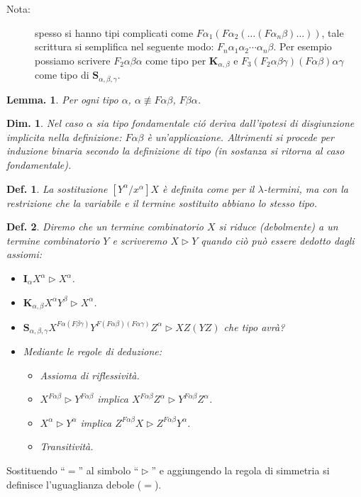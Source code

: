 \documentclass{book}
\newtheorem{definizione}{Def.}[chapter]
\newtheorem{lemma}{Lemma.}[chapter]
\newtheorem{dimostrazione}{Dim.}[chapter]
\newcommand*{\ii}{\mathbf{I}}    %
\newcommand*{\kk}{\mathbf{K}}    %
\newcommand*{\sss}{\mathbf{S}}   %
\newcommand*{\lbts}{$\lambda$-ter\-mi\-ni}
\begin{document}
\begin{description}
\item[Nota:]spesso si hanno tipi complicati come
$F\alpha_1(F\alpha_2(\ldots(F\alpha_n \beta)\ldots))$, tale scrittura si
semplifica nel seguente modo: $F_n \alpha_1 \alpha_2 \cdots \alpha_n \beta$.
Per esempio possiamo scrivere $F_2 \alpha\beta\alpha$ come tipo per
$\kk_{\alpha,\beta}$ e $F_3 (F_2 \alpha\beta\gamma)(F\alpha\beta)\alpha\gamma$
come tipo di $\sss_{\alpha,\beta,\gamma}$.
\end{description}

\begin{lemma}
Per ogni tipo $\alpha$, $\alpha \not\equiv F\alpha\beta$, $F\beta\alpha$.
\end{lemma}
\begin{dimostrazione}
Nel caso $\alpha$ sia tipo fondamentale ci\'o deriva dall'ipotesi di 
disgiunzione implicita nella definizione: $F\alpha\beta$ \`e un'applicazione.
Altrimenti si procede per induzione binaria secondo la definizione di tipo
(in sostanza si ritorna al caso fondamentale).
\end{dimostrazione}

\begin{definizione}
La sostituzione $[Y^\alpha / x^\alpha]X$ \`e definita come per il \lbts, ma
con la restrizione che la variabile e il termine sostituito abbiano lo stesso
tipo.
\end{definizione}

\begin{definizione}
Diremo che un termine combinatorio $X$ si riduce (debolmente) a un termine
combinatorio $Y$ e scriveremo $X \vartriangleright Y$ quando ci\`o pu\`o essere
dedotto dagli assiomi:
\begin{itemize}
\item[($I_\alpha$)]$\ii_\alpha X^\alpha \vartriangleright X^\alpha$.
\item[($K_{\alpha,\beta}$)]$\kk_{\alpha,\beta}X^\alpha Y^\beta 
\vartriangleright X^\alpha$.
\item[($S_{\alpha,\beta,\gamma}$)]$\sss_{\alpha,\beta,\gamma} 
X^{F\alpha(F\beta\gamma)}Y^{F(F\alpha\beta)(F\alpha\gamma)}Z^\alpha
\vartriangleright XZ(YZ)$ che tipo avr\`a?
\item[]Mediante le regole di deduzione:
  \begin{itemize}
    \item[-]Assioma di riflessivit\`a.
    \item[-]$X^{F\alpha\beta} \vartriangleright Y^{F\alpha\beta}$ implica
            $X^{F\alpha\beta}Z^\alpha \vartriangleright 
            Y^{F\alpha\beta}Z^\alpha$.
    \item[-]$X^\alpha \vartriangleright Y^\alpha$ implica $Z^{F\alpha\beta}X
            \vartriangleright Z^{F\alpha\beta}Y^\alpha$.
    \item[-]Transitivit\`a.
\end{itemize}
\end{itemize}
\end{definizione}
Sostituendo ``$=$'' al simbolo ``$\vartriangleright$'' e aggiungendo la regola
di simmetria si definisce l'uguaglianza debole ($=$).
\end{document}

